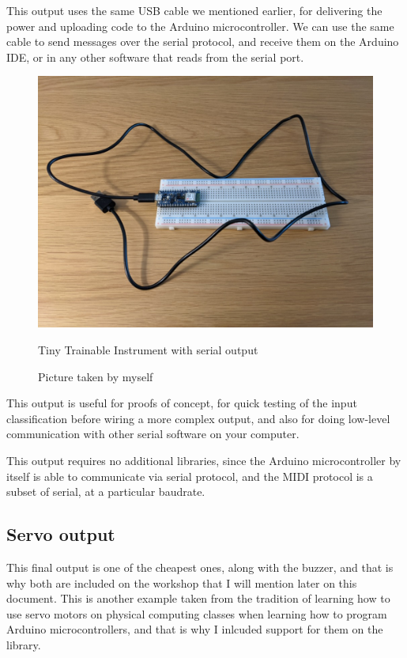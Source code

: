 This output uses the same USB cable we mentioned earlier, for delivering the power and uploading code to the Arduino microcontroller. We can use the same cable to send messages over the serial protocol, and receive them on the Arduino IDE, or in any other software that reads from the serial port.
\begin{figure}[ht]

  \centering
  \includegraphics[width=0.75\linewidth,height=0.25\textheight,keepaspectratio]{images/output-serial.jpg}
  \caption{Tiny Trainable Instrument with serial output}
  \caption*{Picture taken by myself}
  \label{fig:output-serial}
\end{figure}

This output is useful for proofs of concept, for quick testing of the input classification before wiring a more complex output, and also for doing low-level communication with other serial software on your computer. 

This output requires no additional libraries, since the Arduino microcontroller by itself is able to communicate via serial protocol, and the MIDI protocol is a subset of serial, at a particular baudrate.

\subsection{Servo output}

This final output is one of the cheapest ones, along with the buzzer, and that is why both are included on the workshop that I will mention later on this document. This is another example taken from the tradition of learning how to use servo motors on physical computing classes when learning how to program Arduino microcontrollers, and that is why I inlcuded support for them on the library.

